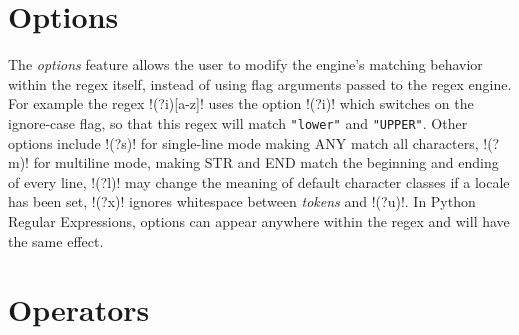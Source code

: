 \section*{Options}
\begin{description} \itemsep -1pt
\item[OPT:] The \emph{options} feature allows the user to modify the engine's matching behavior within the regex itself, instead of using flag arguments passed to the regex engine.  For example the regex \cverb!(?i)[a-z]! uses the option \cverb!(?i)! which switches on the ignore-case flag, so that this regex will match \verb!"lower"! and \verb!"UPPER"!.  Other options include \cverb!(?s)! for single-line mode making ANY match all characters, \cverb!(?m)! for multiline mode, making STR and END match the beginning and ending of every line, \cverb!(?l)! may change the meaning of default character classes if a locale has been set, \cverb!(?x)! ignores whitespace between \emph{tokens} and \cverb!(?u)!.  In Python Regular Expressions, options can appear anywhere within the regex and will have the same effect.
\end{description}

\section*{Operators}
